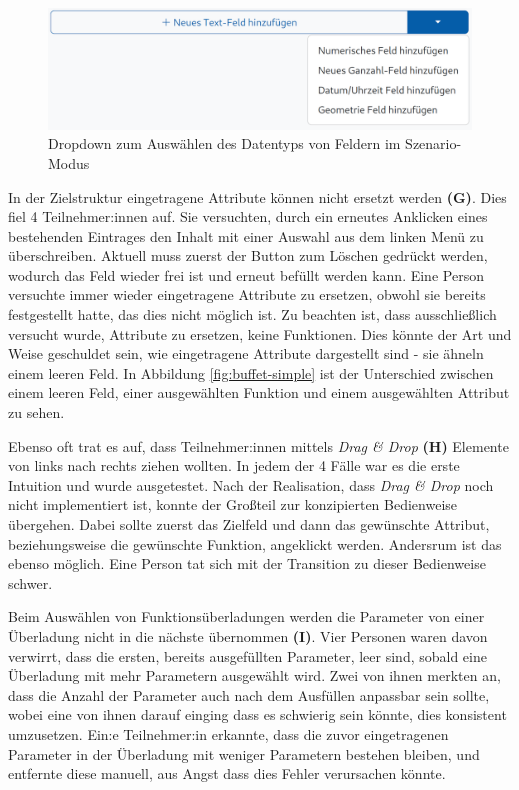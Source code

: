 \begin{figure}
  \centering
  \includegraphics[width=.9\textwidth]{assets/datatype-dropdown.png}
  \caption{Dropdown zum Auswählen des Datentyps von Feldern im Szenario-Modus}
  \label{fig:type-dropdown}
\end{figure}

In der Zielstruktur eingetragene Attribute können nicht ersetzt werden \textbf{(G)}. Dies fiel 4 Teilnehmer:innen auf. Sie versuchten, durch ein erneutes Anklicken eines bestehenden Eintrages den Inhalt mit einer Auswahl aus dem linken Menü zu überschreiben. Aktuell muss zuerst der Button zum Löschen gedrückt werden, wodurch das Feld wieder frei ist und erneut befüllt werden kann. Eine Person versuchte immer wieder eingetragene Attribute zu ersetzen, obwohl sie bereits festgestellt hatte, das dies nicht möglich ist. Zu beachten ist, dass ausschließlich versucht wurde, Attribute zu ersetzen, keine Funktionen. Dies könnte der Art und Weise geschuldet sein, wie eingetragene Attribute dargestellt sind - sie ähneln einem leeren Feld. In Abbildung \ref{fig:buffet-simple} ist der Unterschied zwischen einem leeren Feld, einer ausgewählten Funktion und einem ausgewählten Attribut zu sehen.

Ebenso oft trat es auf, dass Teilnehmer:innen mittels \textit{Drag \& Drop} \textbf{(H)} Elemente von links nach rechts ziehen wollten. In jedem der 4 Fälle war es die erste Intuition und wurde ausgetestet. Nach der Realisation, dass \textit{Drag \& Drop} noch nicht implementiert ist, konnte der Großteil zur konzipierten Bedienweise übergehen. Dabei sollte zuerst das Zielfeld und dann das gewünschte Attribut, beziehungsweise die gewünschte Funktion, angeklickt werden. Andersrum  ist das ebenso möglich. Eine Person tat sich mit der Transition zu dieser Bedienweise schwer.

Beim Auswählen von Funktionsüberladungen werden die Parameter von einer Überladung nicht in die nächste übernommen \textbf{(I)}. Vier Personen waren davon verwirrt, dass die ersten, bereits ausgefüllten Parameter, leer sind, sobald eine Überladung mit mehr Parametern ausgewählt wird. Zwei von ihnen merkten an, dass die Anzahl der Parameter auch nach dem Ausfüllen anpassbar sein sollte, wobei eine von ihnen darauf einging dass es schwierig sein könnte, dies konsistent umzusetzen. Ein:e Teilnehmer:in erkannte, dass die zuvor eingetragenen Parameter in der Überladung mit weniger Parametern bestehen bleiben, und entfernte diese manuell, aus Angst dass dies Fehler verursachen könnte.

